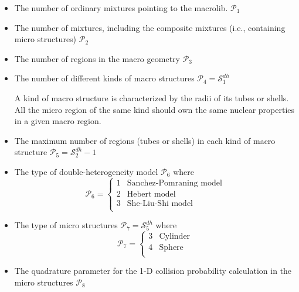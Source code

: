 \begin{itemize}

\item The number of ordinary mixtures pointing to the macrolib. $\mathcal{P}_{1}$

\item The number of mixtures, including the composite mixtures (i.e., containing micro structures)
$\mathcal{P}_{2}$

\item The number of regions in the macro geometry $\mathcal{P}_{3}$

\item The number of different kinds of macro structures $\mathcal{P}_{4}=\mathcal{S}^{dh}_{1}$

 A kind of macro structure is characterized by the radii of its tubes or shells. All the micro region of the same kind should own
the same nuclear properties in a given macro region.

\item The maximum number of regions (tubes or shells) in each kind of macro structure
$\mathcal{P}_{5}=\mathcal{S}^{dh}_{2}-1$

\item The type of double-heterogeneity model $\mathcal{P}_{6}$
\noindent where
\begin{displaymath}
\mathcal{P}_{6} = \left\{
\begin{array}{rl}
 1 & \textrm{Sanchez-Pomraning model} \\
 2 & \textrm{Hebert model} \\
 3 & \textrm{She-Liu-Shi model} \\
\end{array} \right.
\end{displaymath}

\item The type of micro structures $\mathcal{P}_{7}=\mathcal{S}^{dh}_{5}$
\noindent where
\begin{displaymath}
\mathcal{P}_{7} = \left\{
\begin{array}{rl}
 3 & \textrm{Cylinder} \\
 4 & \textrm{Sphere} \\
\end{array} \right.
\end{displaymath}

\item The quadrature parameter for the 1-D collision probability calculation in the micro structures
$\mathcal{P}_{8}$

\end{itemize}

\eject
